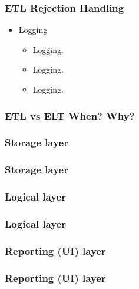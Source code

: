 \begin{frame}
\frametitle{ETL Rejection Handling}
\begin{itemize}[<+->]
	\item Logging
	\begin{itemize}[<+->]
		\item  Logging.
		\item  Logging.
		\item  Logging.
		
		
	\end{itemize}
\end{itemize}
\end{frame}


\begin{frame}
\frametitle{ETL vs ELT When? Why?}
\end{frame}

\subsubsection{Storage layer}

\begin{frame}
\frametitle{Storage layer}
\end{frame}
\subsubsection{Logical layer}

\begin{frame}
\frametitle{Logical layer}
\end{frame}

\subsubsection{Reporting (UI) layer}

\begin{frame}
\frametitle{Reporting (UI) layer}
\end{frame}

